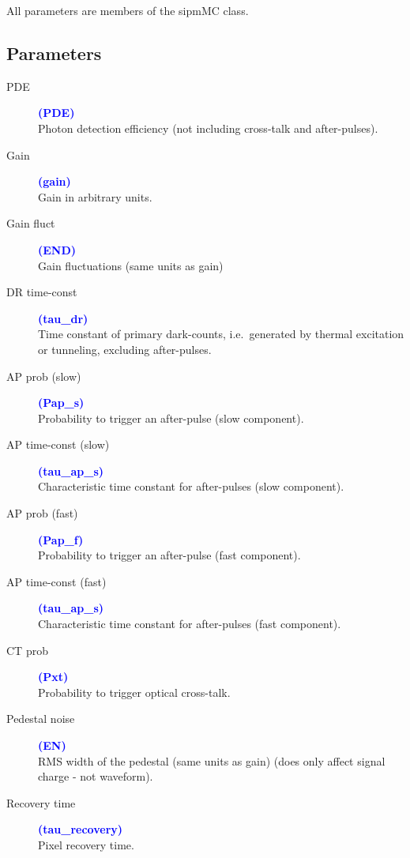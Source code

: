 All parameters are members of the sipmMC class.

\subsection*{Parameters}

\begin{description}
	\item[PDE] \textcolor{blue}{\textbf{(PDE)}}\\
		Photon detection efficiency (not including cross-talk and after-pulses).
	\item[Gain] \textcolor{blue}{\textbf{(gain)}}\\
		Gain in arbitrary units.
	\item[Gain fluct ] \textcolor{blue}{\textbf{(END)}}\\
		Gain fluctuations (same units as gain)
	\item[DR time-const] \textcolor{blue}{\textbf{(tau\_dr)}}\\
		Time constant of primary dark-counts, i.e.\ generated by thermal excitation or tunneling, excluding after-pulses.
	\item[AP prob (slow)] \textcolor{blue}{\textbf{(Pap\_s)}}\\
		Probability to trigger an after-pulse (slow component).
	\item[AP time-const (slow)] \textcolor{blue}{\textbf{(tau\_ap\_s)}}\\
		Characteristic time constant for after-pulses (slow component).
	\item[AP prob (fast)] \textcolor{blue}{\textbf{(Pap\_f)}}\\
		Probability to trigger an after-pulse (fast component).
	\item[AP time-const (fast)] \textcolor{blue}{\textbf{(tau\_ap\_s)}}\\
		Characteristic time constant for after-pulses (fast component).
	\item[CT prob] \textcolor{blue}{\textbf{(Pxt)}}\\
		Probability to trigger optical cross-talk.
	\item[Pedestal noise] \textcolor{blue}{\textbf{(EN)}}\\
		RMS width of the pedestal (same units as gain) (does only affect signal charge - not waveform).
	\item[Recovery time] \textcolor{blue}{\textbf{(tau\_recovery)}}\\
		Pixel recovery time.
\end{description}


